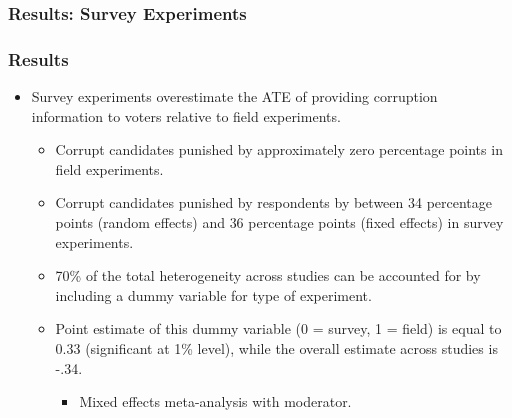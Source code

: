 \documentclass[usenames,dvipsnames]{beamer}
\begin{document}
\begin{frame}
\frametitle{Results: Survey Experiments}


\end{frame}


\begin{frame}
\frametitle{Results}
\begin{itemize}
\item Survey experiments overestimate the ATE of providing corruption information to voters relative to field experiments.
\pause
\begin{itemize}
\item Corrupt candidates punished by approximately \textcolor{Cerulean}{zero percentage points} in field experiments.
\pause
\item Corrupt candidates punished by respondents by between \textcolor{Cerulean}{34 percentage points} (random effects) and \textcolor{Cerulean}{36 percentage points} (fixed effects) in survey experiments.
\pause
\item 70\% of the total heterogeneity across studies can be accounted for by including a dummy variable for type of experiment.
\pause
\item Point estimate of this dummy variable (0 = survey, 1 = field) is equal to 0.33 (significant at 1\% level), while the overall estimate across studies is -.34. 
\begin{itemize}
\item Mixed effects meta-analysis with moderator. 
\end{itemize}
\end{itemize}
\end{itemize}
\end{frame}
\end{document}

